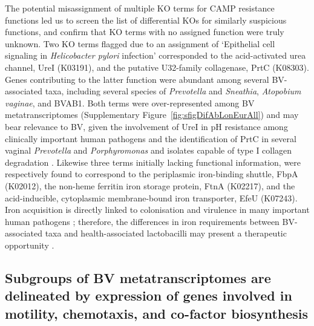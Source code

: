 \documentclass[sn-mathphys,Numbered]{sn-jnl}%
\begin{document}
The potential misassignment of multiple KO terms for CAMP resistance functions led us to screen the list of differential KOs for similarly suspicious functions, and confirm that KO terms with no assigned function were truly unknown. Two KO terms flagged due to an assignment of `Epithelial cell signaling in \textit{Helicobacter pylori} infection' corresponded to the acid-activated urea channel, UreI (K03191), and the putative U32-family collagenase, PrtC (K08303). Genes contributing to the latter function were abundant among several BV-associated taxa, including several species of \textit{Prevotella} and \textit{Sneathia}, \textit{Atopobium vaginae}, and BVAB1. Both terms were over-represented among BV metatranscriptomes (Supplementary Figure~\ref{fig:sfigDifAbLonEurAll}) and may bear relevance to BV, given the involvement of UreI in pH resistance among clinically important human pathogens \citep{strugatsky_structure_2013} and the identification of PrtC in several vaginal \textit{Prevotella} and \textit{Porphyromonas} and isolates capable of type I collagen degradation \citep{lithgow_porph_2022, lithgow_collagenase_2022}. Likewise three terms initially lacking functional information, were respectively found to correspond to the periplasmic iron-binding shuttle, FbpA (K02012), the non-heme ferritin iron storage protein, FtnA (K02217), and the acid-inducible, cytoplasmic membrane-bound iron transporter, EfeU (K07243). Iron acquisition is directly linked to colonisation and virulence in many important human pathogens \citep{chan_structural_2023}; therefore, the differences in iron requirements between BV-associated taxa and health-associated lactobacilli may present a  therapeutic opportunity \citep{weinberg_lactobacillus_1997}.

\subsection{Subgroups of BV metatranscriptomes are delineated by expression of genes involved in motility, chemotaxis, and co-factor biosynthesis}\label{subsec:subsecBVsub}
\end{document}
